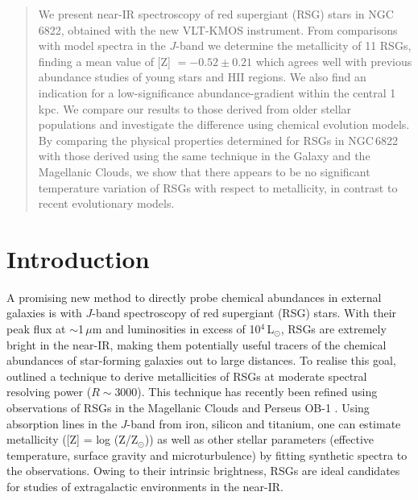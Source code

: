 \documentclass[iop]{emulateapj}
\begin{document}
\begin{abstract}
We present near-IR spectroscopy of red supergiant (RSG) stars in NGC\,6822, obtained with the new VLT-KMOS instrument.
From comparisons with model spectra in the $J$-band we determine the metallicity of 11 RSGs, finding a mean value of [Z] $= -0.52 \pm 0.21$ which agrees well with previous abundance studies of young stars and HII regions.
We also find an indication for a low-significance abundance-gradient within the central 1\,kpc.
We compare our results to those derived from older stellar populations and investigate the difference using chemical evolution models.
By comparing the physical properties determined for RSGs in NGC\,6822 with those derived using the same technique in the Galaxy and the Magellanic Clouds, we show that there appears to be no significant temperature variation of RSGs with respect to metallicity, in contrast to recent evolutionary models.
\end{abstract}




\section{Introduction}

\label{sec:introduction}
A promising new method to directly probe chemical abundances in external galaxies is with $J$-band spectroscopy of red supergiant (RSG) stars.
With their peak flux at
$\sim$1\,$\mu$m and luminosities in excess of
10$^4$\,L$_\odot$, RSGs are extremely bright in the near-IR,
making them potentially useful tracers of the chemical abundances of star-forming galaxies out to large distances.
To realise this goal,
\cite{2010MNRAS.407.1203D} outlined a technique to derive metallicities of RSGs at moderate spectral resolving power
($R\sim$3000).
This technique has recently been refined using observations of RSGs in the Magellanic Clouds
\citep{Davies-prep} and Perseus OB-1
\citep{2014ApJ...788...58G}.
Using absorption lines in the $J$-band from iron, silicon and titanium, one can estimate metallicity
([Z] = log (Z/Z$_{\odot}$)) as well as other stellar parameters
(effective temperature, surface gravity and microturbulence) by fitting synthetic spectra to the observations.
Owing to their intrinsic brightness,
RSGs are ideal candidates for studies of extragalactic environments in the near-IR.
\end{document}

